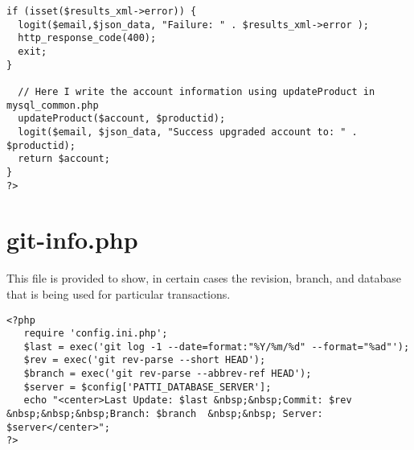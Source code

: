 \documentclass[final,letterpaper,12pt]{article}
\begin{document}
\begin{appendices}
\begin{verbatim}
if (isset($results_xml->error)) {
  logit($email,$json_data, "Failure: " . $results_xml->error );
  http_response_code(400);
  exit;
}

  // Here I write the account information using updateProduct in mysql_common.php
  updateProduct($account, $productid);
  logit($email, $json_data, "Success upgraded account to: " . $productid);
  return $account;
}
?>
\end{verbatim}
\section{git-info.php}
\noindent This file is provided to show, in certain cases the revision, branch, and database that is being used for particular transactions.  
\begin{verbatim}
<?php
   require 'config.ini.php';
   $last = exec('git log -1 --date=format:"%Y/%m/%d" --format="%ad"');
   $rev = exec('git rev-parse --short HEAD');
   $branch = exec('git rev-parse --abbrev-ref HEAD');
   $server = $config['PATTI_DATABASE_SERVER'];
   echo "<center>Last Update: $last &nbsp;&nbsp;Commit: $rev &nbsp;&nbsp;&nbsp;Branch: $branch  &nbsp;&nbsp; Server: $server</center>";
?>
\end{verbatim}
\end{appendices}
\end{document}
